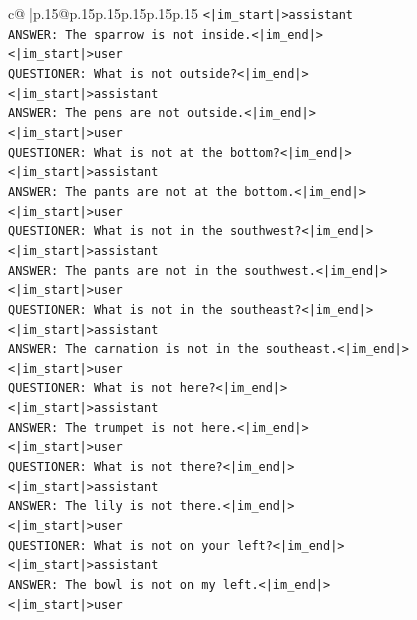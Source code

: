 \documentclass{article}
\begin{document}
{\begin{supertabular}{c@{$\;$}|p{.15\linewidth}@{}p{.15\linewidth}p{.15\linewidth}p{.15\linewidth}p{.15\linewidth}p{.15\linewidth}}
{{{\texttt{<|im\_start|>assistant} \\
\texttt{ANSWER: The sparrow is not inside.<|im\_end|>} \\
\texttt{<|im\_start|>user} \\
\texttt{QUESTIONER: What is not outside?<|im\_end|>} \\
\texttt{<|im\_start|>assistant} \\
\texttt{ANSWER: The pens are not outside.<|im\_end|>} \\
\texttt{<|im\_start|>user} \\
\texttt{QUESTIONER: What is not at the bottom?<|im\_end|>} \\
\texttt{<|im\_start|>assistant} \\
\texttt{ANSWER: The pants are not at the bottom.<|im\_end|>} \\
\texttt{<|im\_start|>user} \\
\texttt{QUESTIONER: What is not in the southwest?<|im\_end|>} \\
\texttt{<|im\_start|>assistant} \\
\texttt{ANSWER: The pants are not in the southwest.<|im\_end|>} \\
\texttt{<|im\_start|>user} \\
\texttt{QUESTIONER: What is not in the southeast?<|im\_end|>} \\
\texttt{<|im\_start|>assistant} \\
\texttt{ANSWER: The carnation is not in the southeast.<|im\_end|>} \\
\texttt{<|im\_start|>user} \\
\texttt{QUESTIONER: What is not here?<|im\_end|>} \\
\texttt{<|im\_start|>assistant} \\
\texttt{ANSWER: The trumpet is not here.<|im\_end|>} \\
\texttt{<|im\_start|>user} \\
\texttt{QUESTIONER: What is not there?<|im\_end|>} \\
\texttt{<|im\_start|>assistant} \\
\texttt{ANSWER: The lily is not there.<|im\_end|>} \\
\texttt{<|im\_start|>user} \\
\texttt{QUESTIONER: What is not on your left?<|im\_end|>} \\
\texttt{<|im\_start|>assistant} \\
\texttt{ANSWER: The bowl is not on my left.<|im\_end|>} \\
\texttt{<|im\_start|>user} \\
}}}
\end{supertabular}}
\end{document}

